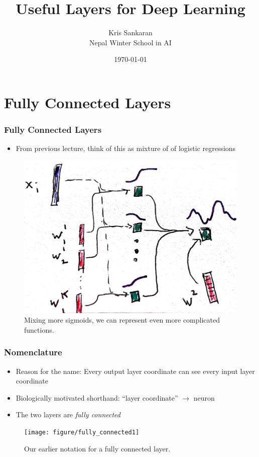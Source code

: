 \documentclass[10pt,mathserif]{beamer}
\title{\large \bfseries Useful Layers for Deep Learning}
\author{Kris Sankaran\\[3ex] Nepal Winter School in AI}
\date{\today}
\begin{document}
\maketitle

\section{Fully Connected Layers}

\begin{frame}
  \frametitle{Fully Connected Layers}
  \begin{itemize}
  \item From previous lecture, think of this as mixture of of logistic
    regressions
  \end{itemize}
  \begin{figure}
    \centering
    \includegraphics[width=0.55\paperwidth]{figure/mixture_logistic_k}
    \caption{Mixing more sigmoids, we can represent even more complicated
      functions. \label{fig:mixture_logistic_k} }
  \end{figure}
\end{frame}

\begin{frame}
  \frametitle{Nomenclature}
  \begin{itemize}
  \item Reason for the name: Every output layer coordinate can see every input
    layer coordinate
  \item Biologically motivated shorthand: ``layer coordinate'' $\rightarrow$ neuron
  \item The two layers are \textit{fully connected}
  \end{itemize}
\begin{figure}
  \centering
  \texttt{[image: figure/fully\_connected1]}
  \caption{Our earlier notation for a fully connected layer.}
\end{figure}
\end{frame}
\end{document}
